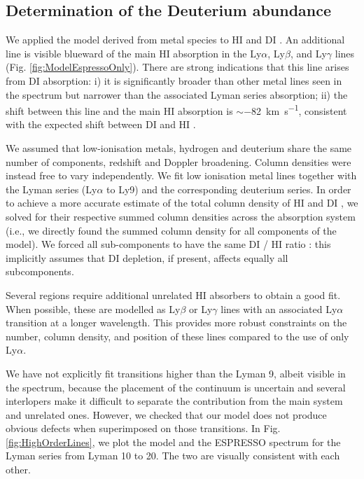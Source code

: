 \documentclass[fleqn,usenatbib]{mnras}
\makeatletter
\DeclareRobustCommand{\ion}[2]{%
  \mbox{#1\check@mathfonts\fontsize\sf@size\z@\selectfont #2}%
}
\DeclareRobustCommand{\kms}[1]{\SI{#1}{\km\per\second}}
\makeatother
\begin{document}
\subsection{Determination of the Deuterium abundance}
\label{sect:DoH_ESPRESSO}
We applied the model derived from metal species to \ion{H}{I} and \ion{D}{I}. An additional line is visible blueward of the main \ion{H}{I} absorption in the Ly$\alpha$, Ly$\beta$, and Ly$\gamma$ lines (Fig. \ref{fig:ModelEspressoOnly}). There are strong indications that this line arises from \ion{D}{I} absorption: i) it is significantly broader than other metal lines seen in the spectrum but narrower than the associated Lyman series absorption; ii) the shift between this line and the main \ion{H}{I} absorption is $\sim$\kms{-82}, consistent with the expected shift between \ion{D}{I} and \ion{H}{I}.

We assumed that low-ionisation metals, hydrogen and deuterium share the same number of components, redshift and Doppler broadening. Column densities were instead free to vary independently. We fit low ionisation metal lines together with the Lyman series (Ly$\alpha$ to Ly9) and the corresponding deuterium series. In order to achieve a more accurate estimate of the total column density of \ion{H}{I} and \ion{D}{I}, we solved for their respective summed column densities across the absorption system (i.e., we directly found the summed column density for all components of the model). We forced all sub-components to have the same \ion{D}{I}/\ion{H}{I} ratio \citep[an hypothesis commonly assumed; see, e.g., ][]{cooke_18}: this implicitly assumes that \ion{D}{I} depletion, if present, affects equally all subcomponents.

Several regions require additional unrelated \ion{H}{I} absorbers to obtain a good fit. When possible, these are modelled as Ly$\beta$ or Ly$\gamma$ lines with an associated Ly$\alpha$ transition at a longer wavelength. This provides more robust constraints on the number, column density, and position of these lines compared to the use of only Ly$\alpha$.

We have not explicitly fit transitions higher than the Lyman 9, albeit visible in the spectrum, because the placement of the continuum is uncertain and several interlopers make it difficult to separate the contribution from the main system and unrelated ones. However, we checked that our model does not produce obvious defects when superimposed on those transitions.
In Fig. \ref{fig:HighOrderLines}, we plot the model and the ESPRESSO spectrum for the Lyman series from Lyman 10 to 20. The two are visually consistent with each other.
\end{document}
